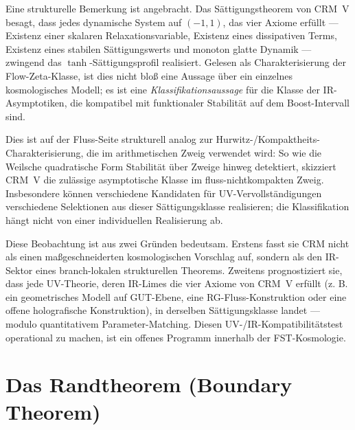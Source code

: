 \documentclass[11pt]{article}
\theoremstyle{definition}
\theoremstyle{remark}
\begin{document}
Eine strukturelle Bemerkung ist angebracht. Das Sättigungstheorem von CRM~V
\cite{CRMV} besagt, dass jedes dynamische System auf $(-1,1)$, das
vier Axiome erfüllt --- Existenz einer skalaren Relaxationsvariable, Existenz eines
dissipativen Terms, Existenz eines stabilen Sättigungswerts und
monoton glatte Dynamik --- zwingend das $\tanh$-Sättigungsprofil realisiert.
Gelesen als Charakterisierung der Flow-Zeta-Klasse, ist dies
nicht bloß eine Aussage über ein einzelnes kosmologisches Modell; es ist eine
\emph{Klassifikationsaussage} für die Klasse der IR-Asymptotiken, die
kompatibel mit funktionaler Stabilität auf dem Boost-Intervall sind.

Dies ist auf der Fluss-Seite strukturell analog zur Hurwitz-/Kompaktheits-Charakterisierung,
die im arithmetischen Zweig verwendet wird: So wie
die Weilsche quadratische Form Stabilität über Zweige hinweg detektiert,
skizziert CRM~V die zulässige asymptotische Klasse im fluss-nichtkompakten
Zweig. Insbesondere können verschiedene Kandidaten für UV-Vervollständigungen
verschiedene Selektionen aus dieser Sättigungsklasse realisieren; die
Klassifikation hängt nicht von einer individuellen Realisierung ab.

Diese Beobachtung ist aus zwei Gründen bedeutsam. Erstens fasst sie CRM
nicht als einen maßgeschneiderten kosmologischen Vorschlag auf, sondern als den IR-Sektor eines
branch-lokalen strukturellen Theorems. Zweitens prognostiziert sie, dass jede UV-Theorie,
deren IR-Limes die vier Axiome von CRM~V erfüllt (z. B. ein
geometrisches Modell auf GUT-Ebene, eine RG-Fluss-Konstruktion oder eine
offene holografische Konstruktion), in derselben Sättigungsklasse
landet --- modulo quantitativem Parameter-Matching. Diesen
UV-/IR-Kompatibilitätstest operational zu machen, ist ein offenes Programm innerhalb
der FST-Kosmologie.

\section{Das Randtheorem (Boundary Theorem)}
\label{sec:boundary}
\end{document}
